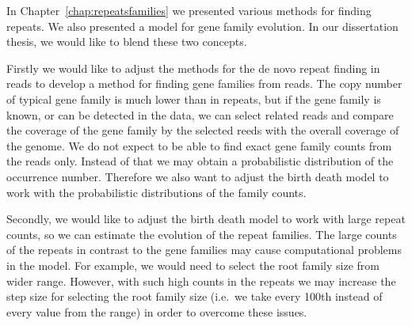 In Chapter~\ref{chap:repeatsfamilies} we presented various methods for finding repeats. We also presented a model for gene family evolution.
In our dissertation thesis, we would like to blend these two concepts.

Firstly we would like to adjust the methods for the de novo repeat finding in reads to develop a method for finding gene families from reads.
The copy number of typical gene family is much lower than in repeats, but if the gene family is known, or can be detected in the data, we can select related reads and compare the coverage of the gene family by the selected reeds with the overall coverage of the genome.
We do not expect to be able to find exact gene family counts from the reads only.
Instead of that we may obtain a probabilistic distribution of the occurrence number.
Therefore we also want to adjust the birth death model to work with the probabilistic distributions of the family counts.

Secondly, we would like to adjust the birth death model to work with large repeat counts, so we can estimate the evolution of the repeat families. The large counts of the repeats in contrast to the gene families may cause computational problems in the model. For example, we would need to select the root family size from wider range.
However, with such high counts in the repeats we may increase the step size for selecting the root family size (i.e.\ we take every 100th instead of every value from the range) in order to overcome these issues.
